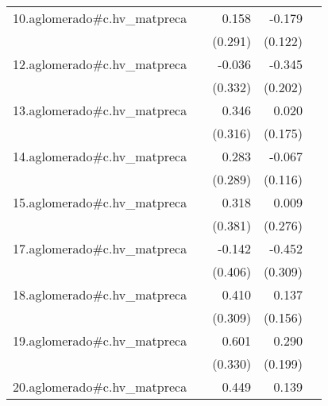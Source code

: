 {\begin{longtable}{l*{4}{D{.}{.}{-1}}}
\addlinespace
10.aglomerado#c.hv\_matpreca&                     &       0.158         &      -0.179         &                     \\
            &                     &     (0.291)         &     (0.122)         &                     \\
\addlinespace
12.aglomerado#c.hv\_matpreca&                     &      -0.036         &      -0.345         &                     \\
            &                     &     (0.332)         &     (0.202)         &                     \\
\addlinespace
13.aglomerado#c.hv\_matpreca&                     &       0.346         &       0.020         &                     \\
            &                     &     (0.316)         &     (0.175)         &                     \\
\addlinespace
14.aglomerado#c.hv\_matpreca&                     &       0.283         &      -0.067         &                     \\
            &                     &     (0.289)         &     (0.116)         &                     \\
\addlinespace
15.aglomerado#c.hv\_matpreca&                     &       0.318         &       0.009         &                     \\
            &                     &     (0.381)         &     (0.276)         &                     \\
\addlinespace
17.aglomerado#c.hv\_matpreca&                     &      -0.142         &      -0.452         &                     \\
            &                     &     (0.406)         &     (0.309)         &                     \\
\addlinespace
18.aglomerado#c.hv\_matpreca&                     &       0.410         &       0.137         &                     \\
            &                     &     (0.309)         &     (0.156)         &                     \\
\addlinespace
19.aglomerado#c.hv\_matpreca&                     &       0.601         &       0.290         &                     \\
            &                     &     (0.330)         &     (0.199)         &                     \\
\addlinespace
20.aglomerado#c.hv\_matpreca&                     &       0.449         &       0.139         &                     \\

\end{longtable}}
